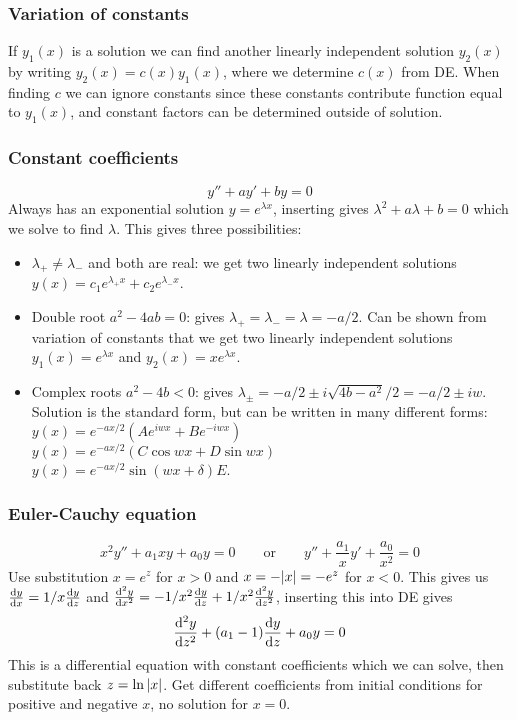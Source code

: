 \documentclass[a4paper, 10pt]{article}
\begin{document}
\begin{multicols*}{3}
\subsubsection*{\small Variation of constants}
If $y_1(x)$ is a solution we can find another linearly independent solution $y_2(x)$ by writing $y_2(x) = c(x)y_1(x)$, where we determine $c(x)$ from DE. When finding $c$ we can ignore constants since these constants contribute function equal to $y_1(x)$, and constant factors can be determined outside of solution.
\subsubsection*{\small Constant coefficients}
$$ y'' + ay' + by = 0$$
Always has an exponential solution $y=e^{\lambda x}$, inserting gives $\lambda^2 + a\lambda + b = 0$ which we solve to find $\lambda$. This gives three possibilities:
\begin{itemize}
  \item $\lambda_+ \neq \lambda_-$ and both are real: we get two linearly independent solutions $y(x) = c_1e^{\lambda_+x} + c_2e^{\lambda_-x}$.
  \item Double root $a^2-4ab=0$: gives $\lambda_+ = \lambda_- = \lambda = -a/2$. Can be shown from variation of constants that we get two linearly independent solutions $y_1(x) = e^{\lambda x}$ and $y_2(x) = xe^{\lambda x}$.
  \item Complex roots $a^2-4b<0$: gives $\lambda_{\pm} = -a/2 \pm i\sqrt{4b-a^2}/2 = -a/2 \pm iw$. Solution is the standard form, but can be written in many different forms: $y(x) = e^{-ax/2}\left(Ae^{iwx} + Be^{-iwx}\right)$\\
  $y(x) = e^{-ax/2}\left( C\cos{wx} + D\sin{wx} \right)$\\
  $y(x) = e^{-ax/2}\sin{(wx+\delta)}E$.
\end{itemize}

\subsubsection*{\small Euler-Cauchy equation}
$$ x^2y'' + a_1xy+a_0y = 0\qquad \text{or}\qquad y''+\frac{a_1}{x}y' + \frac{a_0}{x^2}=0$$
Use substitution $x=e^{z}$ for $x>0$ and $x=-\abs{x}=-e^{z}$ for $x<0$. This gives us $\dv{y}{x}=1/x\dv{y}{z}$ and $\dv[2]{y}{x} = -1/x^2 \dv{y}{z} + 1/x^2\dv[2]{y}{z}$, inserting this into DE gives
$$ \dv[2]{y}{z} + (a_1-1)\dv{y}{z} + a_0y = 0$$
This is a differential equation with constant coefficients which we can solve, then substitute back $z=\ln{\abs{x}}$. Get different coefficients from initial conditions for positive and negative $x$, no solution for $x=0$.


\end{multicols*}
\end{document}
